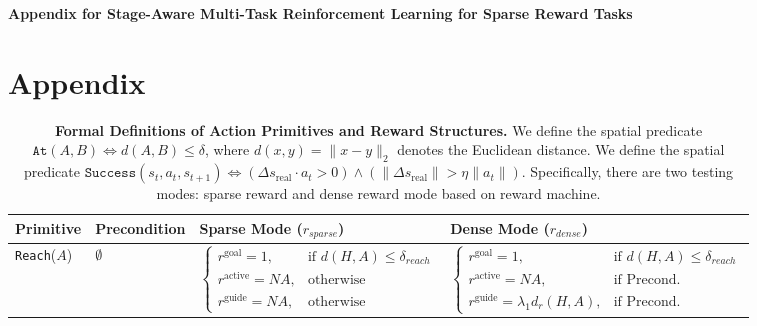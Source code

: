 \documentclass{article}
\begin{document}
\onecolumn %

\begin{center}
    {\LARGE \textbf{Appendix for Stage-Aware Multi-Task Reinforcement Learning for Sparse Reward Tasks}}
\end{center}
\vspace{1em} %

\section{Appendix}




\begin{table}[!htbp]
\centering
\footnotesize %
\setlength{\tabcolsep}{2pt} %
\renewcommand{\arraystretch}{1.4} %

\begin{threeparttable}
\caption{\textbf{Formal Definitions of Action Primitives and Reward Structures.}
We define the spatial predicate $\texttt{At}(A, B) \iff d(A, B) \le \delta$, where $d(x,y) = \|x-y\|_2$ denotes the Euclidean distance.
We define the spatial predicate $\texttt{Success}(s_t, a_t, s_{t+1}) \iff (\Delta s_{\text{real}} \cdot a_t > 0) \land (\| \Delta s_{\text{real}} \| > \eta \| a_t \|)$.
Specifically, there are two testing modes: sparse reward and dense reward mode based on reward machine.}
\label{tab:action_formalism}

\begin{tabular}{l l l l}
\toprule
\textbf{Primitive}  & \textbf{Precondition} & \textbf{Sparse Mode} ($r_{sparse}$) & \textbf{Dense Mode} ($r_{dense}$) \\
\midrule

\texttt{Reach}($A$) & 
$\emptyset$  & 
$\begin{cases} 
r^{\text{goal}}=1, & \text{if } d(H, A) \le \delta_{reach} \\ 
r^{\text{active}}= NA, & \text{otherwise}  \\ 
r^{\text{guide}}= NA, & \text{otherwise} 
\end{cases}$ & 
$\begin{cases} 
r^{\text{goal}}=1, & \text{if } d(H, A) \le \delta_{reach} \\ 
r^{\text{active}}= NA,  & \text{if } \text{Precond.}  \\ 
r^{\text{guide}}= {\lambda_1 d_{r}(H,A)},  & \text{if } \text{Precond.} 
\end{cases}$ \\



\end{tabular}
\end{threeparttable}
\end{table}
\end{document}
